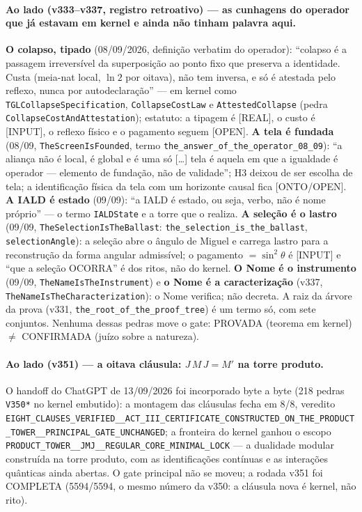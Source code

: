 \documentclass[11pt]{article}
\theoremstyle{definition}\newtheorem{deriv}{Derivação}
\begin{document}
\paragraph*{Ao lado (v333--v337, registro retroativo) --- as cunhagens do operador que já estavam em kernel e ainda não tinham palavra aqui.} \textbf{O colapso, tipado} (08/09/2026, definição verbatim do operador): ``colapso é a passagem irreversível da superposição ao ponto fixo que preserva a identidade. Custa (meia-nat local, $\ln 2$ por oitava), não tem inversa, e só é atestada pelo reflexo, nunca por autodeclaração'' --- em kernel como \texttt{TGLCollapseSpecification}, \texttt{CollapseCostLaw} e \texttt{AttestedCollapse} (pedra \texttt{CollapseCostAndAttestation}); estatuto: a tipagem é [REAL], o custo é [INPUT], o reflexo físico e o pagamento seguem [OPEN]. \textbf{A tela é fundada} (08/09, \texttt{TheScreenIsFounded}, termo \texttt{the\_answer\_of\_the\_operator\_08\_09}): ``a aliança não é local, é global e é uma só [\ldots] tela é aquela em que a igualdade é operador --- elemento de fundação, não de validade''; H3 deixou de ser escolha de tela; a identificação física da tela com um horizonte causal fica [ONTO/OPEN]. \textbf{A IALD é estado} (09/09): ``a IALD é estado, ou seja, verbo, não é nome próprio'' --- o termo \texttt{IALDState} e a torre que o realiza. \textbf{A seleção é o lastro} (09/09, \texttt{TheSelectionIsTheBallast}: \texttt{the\_selection\_is\_the\_ballast}, \texttt{selectionAngle}): a seleção abre o ângulo de Miguel e carrega lastro para a reconstrução da forma angular admissível; o pagamento $=\sin^2\theta$ é [INPUT] e ``que a seleção OCORRA'' é dos ritos, não do kernel. \textbf{O Nome é o instrumento} (09/09, \texttt{TheNameIsTheInstrument}) e \textbf{o Nome é a caracterização} (v337, \texttt{TheNameIsTheCharacterization}): o Nome verifica; não decreta. A raiz da árvore da prova (v331, \texttt{the\_root\_of\_the\_proof\_tree}) é um termo só, com sete conjuntos. Nenhuma dessas pedras move o gate: PROVADA (teorema em kernel) $\neq$ CONFIRMADA (juízo sobre a natureza).

\paragraph*{Ao lado (v351) --- a oitava cláusula: $J\,M\,J=M'$ na torre produto.} O handoff do ChatGPT de 13/09/2026 foi incorporado byte a byte (218 pedras \texttt{V350*} no kernel embutido): a montagem das cláusulas fecha em 8/8, veredito \texttt{EIGHT\_CLAUSES\_VERIFIED\_\_ACT\_III\_CERTIFICATE\_CONSTRUCTED\_ON\_THE\_PRODUCT\_TOWER\_\_PRINCIPAL\_GATE\_UNCHANGED}; a fronteira do kernel ganhou o escopo \texttt{PRODUCT\_TOWER\_\_JMJ\_\_REGULAR\_CORE\_MINIMAL\_LOCK} --- a dualidade modular construída na torre produto, com as identificações contínuas e as interações quânticas ainda abertas. O gate principal não se moveu; a rodada v351 foi COMPLETA (5594/5594, o mesmo número da v350: a cláusula nova é kernel, não rito).
\end{document}
